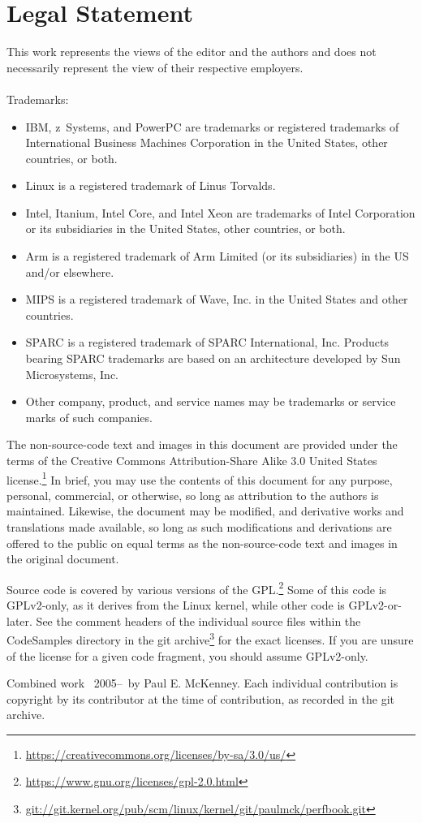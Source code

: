 
\section*{Legal Statement}

This work represents the views of the editor and the authors and does not
necessarily represent the view of their respective employers. \\
\\
Trademarks:
\begin{itemize}
\item	IBM, z~Systems, and PowerPC are trademarks or registered trademarks
	of International Business Machines Corporation in the United
	States, other countries, or both.
\item	Linux is a registered trademark of Linus Torvalds.
\item	Intel, Itanium, Intel Core, and Intel Xeon are trademarks
	of Intel Corporation or its subsidiaries in the United States,
	other countries, or both.
\item	Arm is a registered trademark of Arm Limited (or its subsidiaries)
	in the US and/or elsewhere.
\item	MIPS is a registered trademark of Wave, Inc. in the United States
	and other countries.
\item	SPARC is a registered trademark of SPARC International, Inc.
	Products bearing SPARC trademarks are based on an architecture
	developed by Sun Microsystems, Inc.
\item	Other company, product, and service names may be trademarks or
	service marks of such companies.
\end{itemize}

The non-source-code text and images in this document are provided under
the terms of the Creative Commons Attribution-Share Alike 3.0 United
States license.\footnote{
	\url{https://creativecommons.org/licenses/by-sa/3.0/us/}}
In brief, you may use the contents of this document for any purpose,
personal, commercial, or otherwise, so long as attribution to the
authors is maintained.  Likewise, the document may be modified,
and derivative works and translations made available, so long as
such modifications and derivations are offered to the public on equal
terms as the non-source-code text and images in the original document.

Source code is covered by various versions of the GPL.\footnote{
	\url{https://www.gnu.org/licenses/gpl-2.0.html}}
Some of this code is GPLv2-only, as it derives from the Linux kernel,
while other code is GPLv2-or-later.
See the comment headers of the individual source files within the
CodeSamples directory in the git archive\footnote{
	\url{git://git.kernel.org/pub/scm/linux/kernel/git/paulmck/perfbook.git}}
for the exact licenses.
If you are unsure of the license for a given code fragment,
you should assume GPLv2-only.

Combined work {\textcopyright}~2005--\commityear\ by Paul E. McKenney.
Each individual contribution is copyright by its contributor at the time
of contribution, as recorded in the git archive.
